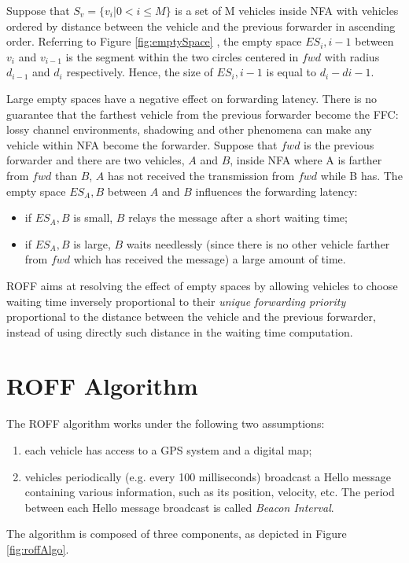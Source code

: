 			Suppose that $S_v = \{v_i | 0 < i \leq M\}$ is a set of M vehicles inside NFA with vehicles ordered by distance between the vehicle and the previous forwarder in ascending order. Referring to Figure \ref{fig:emptySpace} , the empty space $ES_i,i-1$ between $v_i$ and $v_{i-1}$ is the segment within the two circles centered in $fwd$ with radius $d_{i-1}$ and $d_i$ respectively. Hence, the size of $ES_i,i-1$ is equal to $d_i - d{i-1}$.
			
			
			Large empty spaces have a negative effect on forwarding latency. There is no guarantee that the farthest vehicle from the previous forwarder become the FFC: lossy channel environments, shadowing and other phenomena can make any vehicle within NFA become the forwarder. Suppose that $fwd$ is the previous forwarder and there are two vehicles, $A$ and $B$, inside NFA where A is farther from $fwd$ than $B$, $A$ has not received the transmission from $fwd$ while B has. The empty space $ES_A,B$ between $A$ and $B$ influences the forwarding latency:
			\begin{itemize}
				\item if  $ES_A,B$ is small, $B$ relays the message after a short waiting time;
				\item if $ES_A,B$ is large, $B$ waits needlessly (since there is no other vehicle farther from $fwd$ which has received the message) a large amount of time.
			\end{itemize}
			ROFF aims at resolving the effect of empty spaces by allowing vehicles to choose waiting time inversely proportional to their \textit{unique forwarding priority} proportional to the distance between the vehicle and the previous forwarder, instead of using directly such distance in the waiting time computation.
		
	\section{ROFF Algorithm}
		The ROFF algorithm works under the following two assumptions:
		\begin{enumerate}
			\item each vehicle has access to a GPS system and a digital map;
			\item vehicles periodically (e.g. every 100 milliseconds) broadcast a Hello message containing various information, such as its position, velocity, etc. The period between each Hello message broadcast is called \textit{Beacon Interval}.
		\end{enumerate}
		The algorithm is composed of three components, as depicted in Figure \ref{fig:roffAlgo}.
	
